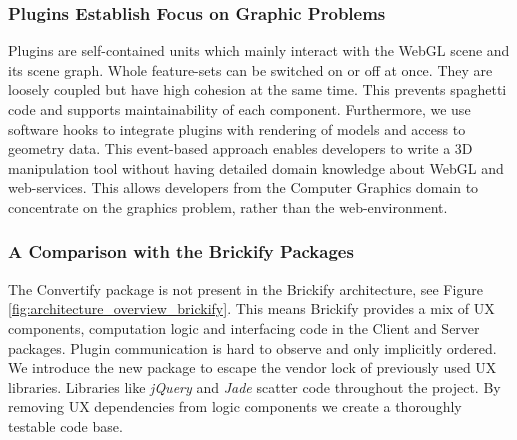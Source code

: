 \documentclass[../ClassicThesis.tex]{subfiles}
\begin{document}
\subsubsection{Plugins Establish Focus on Graphic Problems}

Plugins are self-contained units which mainly interact with the WebGL scene and
its scene graph. Whole feature-sets can be switched on or off at once. They are
loosely coupled but have high cohesion at the same time. This prevents spaghetti
code and supports maintainability of each component. Furthermore, we use
software hooks to integrate plugins with rendering of models and access to
geometry data. This event-based approach enables developers to write a 3D
manipulation tool without having detailed domain knowledge about WebGL and
web-services. This allows developers from the Computer Graphics domain to
concentrate on the graphics problem, rather than the web-environment.



\subsubsection{A Comparison with the Brickify Packages}

The Convertify package is not present in the Brickify architecture, see Figure
\ref{fig:architecture_overview_brickify}. This means Brickify provides a mix of
UX components, computation logic and interfacing code in the Client and Server
packages. Plugin communication is hard to observe and only implicitly ordered.
We introduce the new package to escape the vendor lock of previously used UX libraries. Libraries like 
\emph{jQuery} and \emph{Jade}  scatter code throughout the
project. By removing UX dependencies from logic components we create a
thoroughly testable code base.
\end{document}
